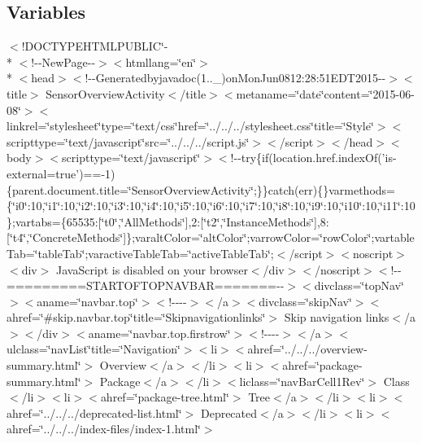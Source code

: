\subsection*{Variables}
\begin{DoxyCompactItemize}
\item 
$<$!D\-O\-C\-T\-Y\-P\-E\-H\-T\-M\-L\-P\-U\-B\-L\-I\-C\char`\"{}-\/\\*
$<$!-\/-\/New\-Page-\/-\/$>$$<$htmllang=\char`\"{}en\char`\"{}$>$\\*
$<$head$>$$<$!-\/-\/Generatedbyjavadoc(1..\-\_)on\-Mon\-Jun0812\-:28\-:51\-E\-D\-T2015-\/-\/$>$$<$title$>$ Sensor\-Overview\-Activity$<$/title$>$$<$metaname=\char`\"{}date\char`\"{}content=\char`\"{}2015-\/06-\/08\char`\"{}$>$$<$linkrel=\char`\"{}stylesheet\char`\"{}type=\char`\"{}text/css\char`\"{}href=\char`\"{}../../../stylesheet.\-css\char`\"{}title=\char`\"{}\-Style\char`\"{}$>$$<$scripttype=\char`\"{}text/javascript\char`\"{}src=\char`\"{}../../../script.\-js\char`\"{}$>$$<$/script$>$$<$/head$>$$<$body$>$$<$scripttype=\char`\"{}text/javascript\char`\"{}$>$$<$!-\/-\/try\{if(location.\-href.\-index\-Of('is-\/external=true')==-\/1)\{parent.\-document.\-title=\char`\"{}\-Sensor\-Overview\-Activity\char`\"{};\}\}catch(err)\{\}varmethods=\{\char`\"{}i0\char`\"{}\-:10,\char`\"{}i1\char`\"{}\-:10,\char`\"{}i2\char`\"{}\-:10,\char`\"{}i3\char`\"{}\-:10,\char`\"{}i4\char`\"{}\-:10,\char`\"{}i5\char`\"{}\-:10,\char`\"{}i6\char`\"{}\-:10,\char`\"{}i7\char`\"{}\-:10,\char`\"{}i8\char`\"{}\-:10,\char`\"{}i9\char`\"{}\-:10,\char`\"{}i10\char`\"{}\-:10,\char`\"{}i11\char`\"{}\-:10\};vartabs=\{65535\-:\mbox{[}\char`\"{}t0\char`\"{},\char`\"{}\-All\-Methods\char`\"{}\mbox{]},2\-:\mbox{[}\char`\"{}t2\char`\"{},\char`\"{}\-Instance\-Methods\char`\"{}\mbox{]},8\-:\mbox{[}\char`\"{}t4\char`\"{},\char`\"{}\-Concrete\-Methods\char`\"{}\mbox{]}\};varalt\-Color=\char`\"{}alt\-Color\char`\"{};varrow\-Color=\char`\"{}row\-Color\char`\"{};vartable\-Tab=\char`\"{}table\-Tab\char`\"{};varactive\-Table\-Tab=\char`\"{}active\-Table\-Tab\char`\"{};$<$/script$>$$<$noscript$>$$<$div$>$ Java\-Script is disabled on your browser$<$/div$>$$<$/noscript$>$$<$!-\/-\/=========\-S\-T\-A\-R\-T\-O\-F\-T\-O\-P\-N\-A\-V\-B\-A\-R=======-\/-\/$>$$<$divclass=\char`\"{}top\-Nav\char`\"{}$>$$<$aname=\char`\"{}navbar.\-top\char`\"{}$>$$<$!-\/-\/-\/-\/$>$$<$/a$>$$<$divclass=\char`\"{}skip\-Nav\char`\"{}$>$$<$ahref=\char`\"{}\#skip.\-navbar.\-top\char`\"{}title=\char`\"{}\-Skipnavigationlinks\char`\"{}$>$ Skip navigation links$<$/a$>$$<$/div$>$$<$aname=\char`\"{}navbar.\-top.\-firstrow\char`\"{}$>$$<$!-\/-\/-\/-\/$>$$<$/a$>$$<$ulclass=\char`\"{}nav\-List\char`\"{}title=\char`\"{}\-Navigation\char`\"{}$>$$<$li$>$$<$ahref=\char`\"{}../../../overview-\/summary.\-html\char`\"{}$>$ Overview$<$/a$>$$<$/li$>$$<$li$>$$<$ahref=\char`\"{}package-\/summary.\-html\char`\"{}$>$ Package$<$/a$>$$<$/li$>$$<$liclass=\char`\"{}nav\-Bar\-Cell1\-Rev\char`\"{}$>$ Class$<$/li$>$$<$li$>$$<$ahref=\char`\"{}package-\/tree.\-html\char`\"{}$>$ Tree$<$/a$>$$<$/li$>$$<$li$>$$<$ahref=\char`\"{}../../../deprecated-\/list.\-html\char`\"{}$>$ Deprecated$<$/a$>$$<$/li$>$$<$li$>$$<$ahref=\char`\"{}../../../index-\/files/index-\/1.\-html\char`\"{}$>$ $$
\end{DoxyCompactItemize}
